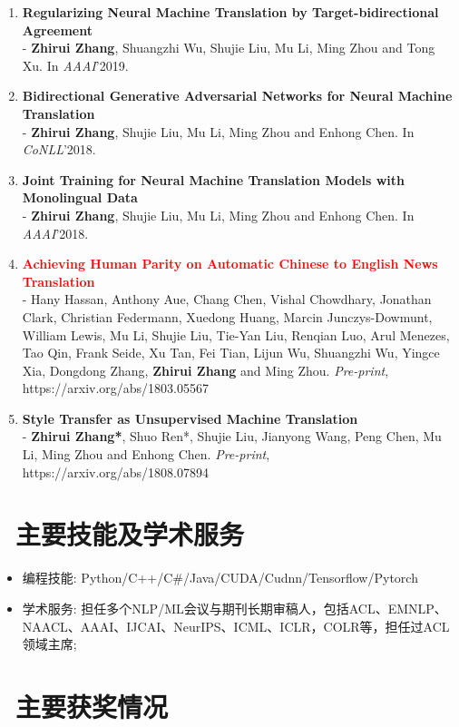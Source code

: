 \documentclass{resume}
\begin{document}
\begin{enumerate}
\item \normalsize \textbf{Regularizing Neural Machine Translation by Target-bidirectional Agreement} \\
\small - \textbf{Zhirui Zhang}, Shuangzhi Wu, Shujie Liu, Mu Li, Ming Zhou and Tong Xu. In \textit{AAAI}'2019.

\item \normalsize \textbf{Bidirectional Generative Adversarial Networks for Neural Machine Translation} \\
\small - \textbf{Zhirui Zhang}, Shujie Liu, Mu Li, Ming Zhou and Enhong Chen. In \textit{CoNLL}'2018.

\item \normalsize \textbf{Joint Training for Neural Machine Translation Models with Monolingual Data} \\
\small - \textbf{Zhirui Zhang}, Shujie Liu, Mu Li, Ming Zhou and Enhong Chen. In \textit{AAAI}'2018.

\item \normalsize \textcolor{red}{\textbf{Achieving Human Parity on Automatic Chinese to English News Translation}} \\
\small - Hany Hassan, Anthony Aue, Chang Chen, Vishal Chowdhary, Jonathan Clark, Christian Federmann, Xuedong Huang, Marcin Junczys-Dowmunt, William Lewis, Mu Li, Shujie Liu, Tie-Yan Liu, Renqian Luo, Arul Menezes, Tao Qin, Frank Seide, Xu Tan, Fei Tian, Lijun Wu, Shuangzhi Wu, Yingce Xia, Dongdong Zhang, \textbf{Zhirui Zhang} and Ming Zhou. \textit{Pre-print}, https://arxiv.org/abs/1803.05567 

\item \normalsize \textbf{Style Transfer as Unsupervised Machine Translation} \\
\small - \textbf{Zhirui Zhang*}, Shuo Ren*, Shujie Liu, Jianyong Wang, Peng Chen, Mu Li, Ming Zhou and Enhong Chen. \textit{Pre-print}, https://arxiv.org/abs/1808.07894

\end{enumerate}

\section{\faCogs\ 主要技能及学术服务}
\begin{itemize}
  \item 编程技能: Python/C++/C\#/Java/CUDA/Cudnn/Tensorflow/Pytorch
  \item 学术服务: 担任多个NLP/ML会议与期刊长期审稿人，包括ACL、EMNLP、NAACL、AAAI、IJCAI、NeurIPS、ICML、ICLR，COLR等，担任过ACL领域主席;
\end{itemize}

\section{\faHeartO\ 主要获奖情况}

%
%
\end{document}
